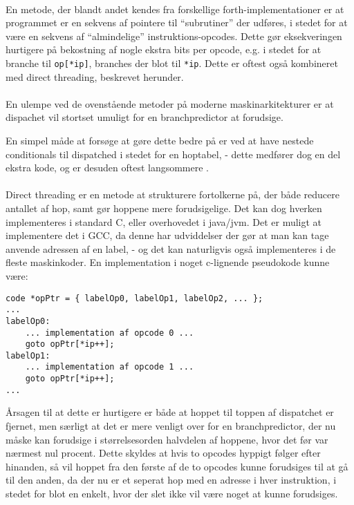 \paragraph{}
En metode, der blandt andet kendes fra forskellige forth-implementationer er at programmet er en sekvens af pointere til ``subrutiner'' der udføres, i stedet for at være en sekvens af ``almindelige'' instruktions-opcodes. Dette gør eksekveringen hurtigere på bekostning af nogle ekstra bits per opcode, e.g. i stedet for at branche til \verb|op[*ip]|, branches der blot til \verb|*ip|. Dette er oftest også kombineret med direct threading, beskrevet herunder.

\paragraph{}
En ulempe ved de ovenstående metoder på moderne maskinarkitekturer er at dispachet vil stortset umuligt for en branchpredictor at forudsige.

En simpel måde at forsøge at gøre dette bedre på er ved at have nestede conditionals til dispatched i stedet for en hoptabel, - dette medfører dog en del ekstra kode, og er desuden oftest langsommere \cite{cond-dispatch}.

\paragraph{}
Direct threading er en metode at strukturere fortolkerne på, der både reducere antallet af hop, samt gør hoppene mere forudsigelige. Det kan dog hverken implementeres i standard C, eller overhovedet i java/jvm. Det er muligt at implementere det i GCC, da denne har udviddelser der gør at man kan tage anvende adressen af en label, - og det kan naturligvis også implementeres i de fleste maskinkoder. En implementation i noget c-lignende pseudokode kunne være:
\begin{verbatim}
code *opPtr = { labelOp0, labelOp1, labelOp2, ... };
...
labelOp0:
    ... implementation af opcode 0 ...
    goto opPtr[*ip++];
labelOp1:
    ... implementation af opcode 1 ...
    goto opPtr[*ip++];
...
\end{verbatim}
Årsagen til at dette er hurtigere er både at hoppet til toppen af dispatchet er fjernet,
men særligt at det er mere venligt over for en branchpredictor, der nu måske kan forudsige i størrelsesorden halvdelen af hoppene, hvor det før var nærmest nul procent. Dette skyldes at hvis to opcodes hyppigt følger efter hinanden, så vil hoppet fra den første af de to opcodes kunne forudsiges til at gå til den anden, da der nu er et seperat hop med en adresse i hver instruktion, i stedet for blot en enkelt, hvor der slet ikke vil være noget at kunne forudsiges.


